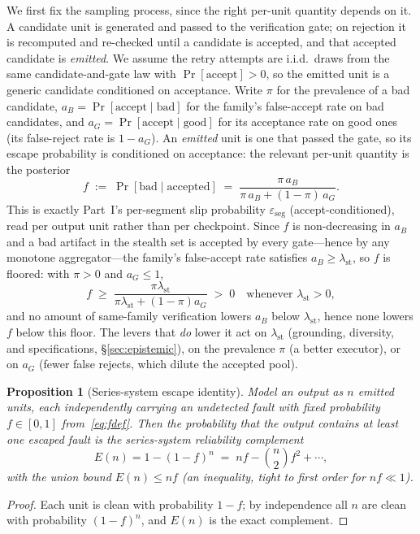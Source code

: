 \documentclass[11pt]{article}
\newtheorem{proposition}{Proposition}
\theoremstyle{definition}
\theoremstyle{remark}
\newcommand{\lst}{\lambda_{\mathrm{st}}}
\newcommand{\eseg}{\varepsilon_{\mathrm{seg}}}
\newcommand{\Esc}{E}
\newcommand{\fesc}{f}
\begin{document}
We first fix the sampling process, since the right per-unit quantity depends on it. A candidate unit
is generated and passed to the verification gate; on rejection it is recomputed and re-checked until a
candidate is accepted, and that accepted candidate is \emph{emitted}. We assume the retry attempts are
i.i.d.\ draws from the same candidate-and-gate law with $\Pr[\text{accept}]>0$, so the emitted unit is a
generic candidate conditioned on acceptance. Write $\pi$ for the prevalence of
a bad candidate, $a_B=\Pr[\text{accept}\mid\text{bad}]$ for the family's false-accept rate on bad
candidates, and $a_G=\Pr[\text{accept}\mid\text{good}]$ for its acceptance rate on good ones (its
false-reject rate is $1-a_G$). An \emph{emitted} unit is one that passed the gate, so its escape
probability is conditioned on acceptance: the relevant per-unit quantity is the posterior
\begin{equation}\label{eq:fdef}
\fesc\;:=\;\Pr[\text{bad}\mid\text{accepted}]\;=\;\frac{\pi\,a_B}{\pi\,a_B+(1-\pi)\,a_G}.
\end{equation}
This is exactly Part~I's per-segment slip probability $\eseg$ (accept-conditioned), read per output unit
rather than per checkpoint. Since $\fesc$ is non-decreasing in $a_B$ and a bad artifact in the stealth set
is accepted by every gate---hence by any monotone aggregator---the family's false-accept rate satisfies
$a_B\ge\lst$, so $\fesc$ is floored: with $\pi>0$ and $a_G\le1$,
\begin{equation}\label{eq:ffloor}
\fesc\;\ge\;\frac{\pi\lst}{\pi\lst+(1-\pi)a_G}\;>\;0\quad\text{whenever }\lst>0,
\end{equation}
and no amount of same-family verification lowers $a_B$ below $\lst$, hence none lowers $\fesc$ below
this floor. The levers that \emph{do} lower it act on $\lst$ (grounding, diversity, and specifications,
\S\ref{sec:epistemic}), on the prevalence $\pi$ (a better executor), or on $a_G$ (fewer false rejects,
which dilute the accepted pool).

\begin{proposition}[Series-system escape identity]\label{thm:escape}
Model an output as $n$ emitted units, each independently carrying an undetected fault with fixed
probability $\fesc\in[0,1]$ from~\eqref{eq:fdef}. Then the probability that the output contains at least
one escaped fault is the series-system reliability complement
\begin{equation}\label{eq:escape}
\Esc(n)=1-(1-\fesc)^n\;=\;n\fesc-\binom{n}{2}\fesc^2+\cdots,
\end{equation}
with the union bound $\Esc(n)\le n\fesc$ (an inequality, tight to first order for $n\fesc\ll1$).
\end{proposition}
\begin{proof}
Each unit is clean with probability $1-\fesc$; by independence all $n$ are clean with probability
$(1-\fesc)^n$, and $\Esc(n)$ is the exact complement.
\end{proof}
\end{document}
